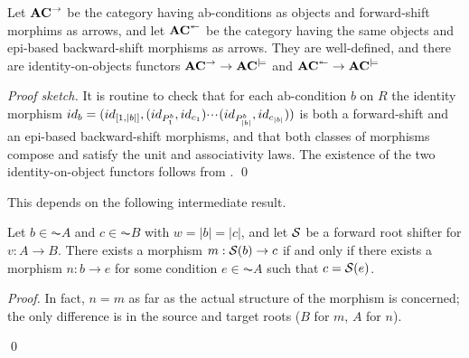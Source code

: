 \begin{theorem} 
Let $\mathbf{AC}^{\to}$ be the category having ab-conditions as objects and forward-shift morphims as arrows, and let $\mathbf{AC}^{\twoheadleftarrow}$ be the category having the same objects and epi-based backward-shift morphisms as arrows. They are well-defined, and there are identity-on-objects functors $\mathbf{AC}^{\to} \to \mathbf{AC}^{\models}$ and $\mathbf{AC}^{\twoheadleftarrow} \to \mathbf{AC}^{\models}$
\end{theorem}
\emph{Proof sketch.}
It is routine to check that for each ab-condition $b$ on $R$ the identity morphism $id_b = (id_{[1,|b|]},(id_{P^b_1},id_{c_1}){\cdotp\mkern-2mu\cdotp\mkern-2mu\cdotp\mkern1mu} (id_{P^b_{|b|}},id_{c_{|b|}}))$ is both a forward-shift and an epi-based backward-shift morphisms, and that both classes of morphisms compose and satisfy the unit and associativity laws. The existence of the two identity-on-object functors follows from .
\qed 


This depends on the following intermediate result.

\begin{lemma}
Let $b\in \AC A$ and $c\in \AC B$ with $w=|b|=|c|$, and let $\mathcal{S}$ be a forward root shifter for $v:A\to B$. There exists a morphism $m:\mathcal{S}(b)\to c$ if and only if there exists a morphism $n:b\to e$ for some condition $e\in \AC A$ such that $c=\mathcal{S}(e)$.
\end{lemma}
%
\begin{proof}
In fact, $n=m$ as far as the actual structure of the morphism is concerned; the only difference is in the source and target roots ($B$ for $m$, $A$ for $n$).

\qed
\end{proof}

